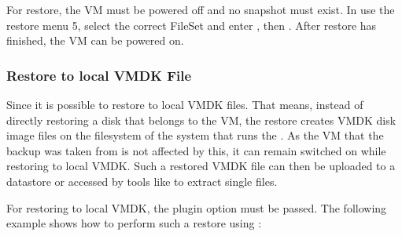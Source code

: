 For restore, the VM must be powered off and no snapshot must exist.
In  use the restore menu 5, select the correct FileSet
and enter , then . After restore has finished,
the VM can be powered on.

\subsubsection{Restore to local VMDK File}

Since 
it is possible to restore to local VMDK files. That means, instead of directly
restoring a disk that belongs to the VM, the restore creates VMDK disk image files
on the filesystem of the system that runs the \bareosFd. As the VM that the backup
was taken from is not affected by this, it can remain switched on while restoring
to local VMDK. Such a restored VMDK file can then be uploaded to a \vSphere datastore
or accessed by tools like  to extract single files.

For restoring to local VMDK, the plugin option  must be passed.
The following example shows how to perform such a restore using :

